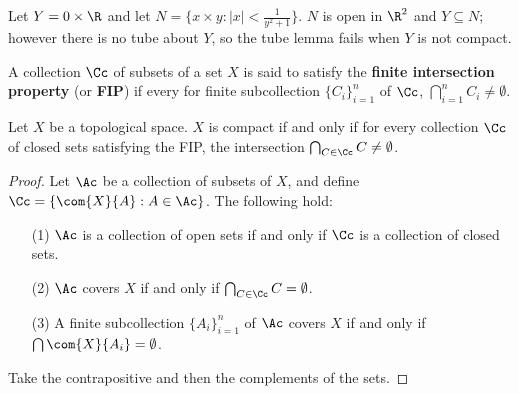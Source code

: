 \begin{example}
    Let $Y=0 \times \R$ and let  $N=\{x \times y: |x|<\frac{1}{y^2+1}\}$. $N$ is open in  $\R^2$ and
     $Y \subseteq N$; however there is no tube about  $Y$, so the tube lemma fails when  $Y$ is not
     compact.
\end{example}

\begin{definition}
    A collection $\Cc$ of subsets of a set  $X$ is said to satisfy the  \textbf{finite intersection
    property} (or \textbf{FIP}) if every for finite subcollection $\{C_i\}_{i=1}^n$ of $\Cc$,
    $\bigcap_{i=1}^n{C_i} \neq \emptyset$.
\end{definition}

\begin{theorem}\label{3.4.8}
    Let $X$ be a topological space.  $X$ is compact if and only if for every collection  $\Cc$ of
    closed sets satisfying the FIP, the intersection $\bigcap_{C \in \Cc}{C} \neq \emptyset$.
\end{theorem}
\begin{proof}
    Let $\Ac$ be a collection of subsets of  $X$, and define  $\Cc=\{\com{X}{A}:A \in \Ac\}$. The
    following hold:
    \begin{enumerate}
        \item[(1)] $\Ac$ is a collection of open sets if and only if $\Cc$ is a collection of closed
            sets.

        \item [(2)] $\Ac$ covers  $X$ if and only if  $\bigcap_{C \in \Cc}{C}=\emptyset$.

        \item[(3)] A finite subcollection $\{A_i\}_{i=1}^n$ of $\Ac$ covers  $X$ if and only if
            $\bigcap{\com{X}{A_i}}=\emptyset$.
    \end{enumerate}
    Take the contrapositive and then the complements of the sets.
\end{proof}
